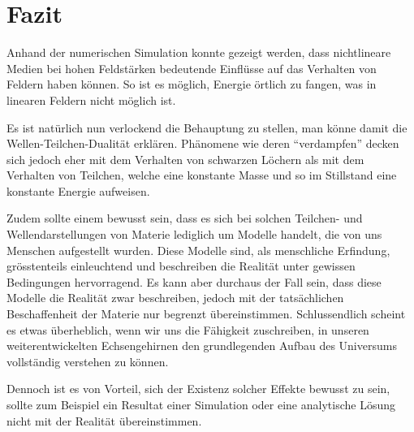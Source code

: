 %
%
%
%
\section{Fazit\label{particles:section:fazit}}

Anhand der numerischen Simulation konnte gezeigt werden, dass nichtlineare Medien bei hohen Feldstärken bedeutende Einflüsse auf das Verhalten von Feldern haben können.
So ist es möglich, Energie örtlich zu fangen, was in linearen Feldern nicht möglich ist.

Es ist natürlich nun verlockend die Behauptung zu stellen, man könne damit die Wellen-Teilchen-Dualität erklären.
Phänomene wie deren ``verdampfen'' decken sich jedoch eher mit dem Verhalten von schwarzen Löchern als mit dem Verhalten von Teilchen, welche eine konstante Masse und so im Stillstand eine konstante Energie aufweisen.
%

Zudem sollte einem bewusst sein, dass es sich bei solchen Teilchen- und Wellendarstellungen von Materie lediglich um Modelle handelt, die von uns Menschen aufgestellt wurden.
Diese Modelle sind, als menschliche Erfindung, grösstenteils einleuchtend und beschreiben die Realität unter gewissen Bedingungen hervorragend.
Es kann aber durchaus der Fall sein, dass diese Modelle die Realität zwar beschreiben, jedoch mit der tatsächlichen Beschaffenheit der Materie nur begrenzt übereinstimmen.
Schlussendlich scheint es etwas überheblich, wenn wir uns die Fähigkeit zuschreiben, in unseren weiterentwickelten Echsengehirnen den grundlegenden Aufbau des Universums vollständig verstehen zu können.

Dennoch ist es von Vorteil, sich der Existenz solcher Effekte bewusst zu sein, sollte zum Beispiel ein Resultat einer Simulation oder eine analytische Lösung nicht mit der Realität übereinstimmen.
